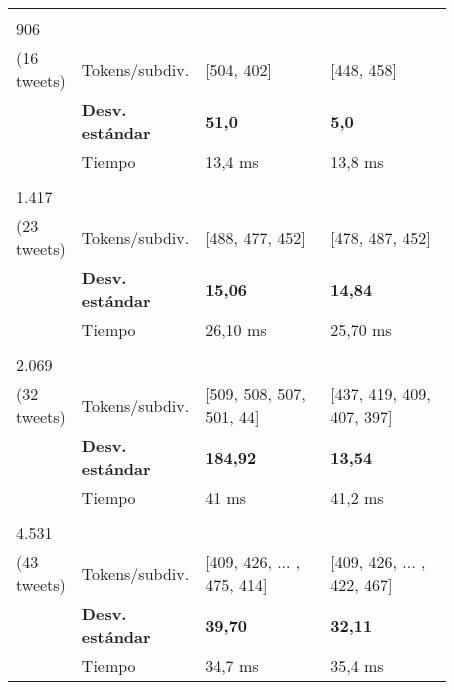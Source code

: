 \begin{table}[H]
\begin{tabular}{>{\centering}b{0.09\linewidth}>{\raggedright}b{0.18\linewidth}>{\raggedright}b{0.3\linewidth}>{\raggedright\arraybackslash}b{0.3\linewidth}}
		\midrule
		
		\multirow{3}{*}{\begin{minipage}{0.5in}\centering 646\\ \scriptsize{906} \\ \tiny{(16 tweets)} \end{minipage}}	& \small{Tokens/subdiv.} & \small{[504, 402]} & \small{[448, 458]} \\
		& \small{\textbf{Desv. estándar}} & \small{\textbf{51,0}} & \small{\textbf{5,0}} \\
		& \small{Tiempo} & \small{13,4 ms} & \small{13,8 ms} \\
		
		\midrule
		
		\multirow{3}{*}{\begin{minipage}{0.5in}\centering 1.089 \\ \scriptsize{1.417} \\ \tiny{(23 tweets)} \end{minipage}}	& \small{Tokens/subdiv.} & \small{[488, 477, 452]} & \small{[478, 487, 452]} \\
		& \small{\textbf{Desv. estándar}} & \small{\textbf{15,06}} & \small{\textbf{14,84}} \\
		& \small{Tiempo} & \small{26,10 ms} & \small{25,70 ms} \\
		
		\midrule
		
		\multirow{3}{*}{\begin{minipage}{0.5in}\centering 1.536\\ \scriptsize{2.069} \\ \tiny{(32 tweets)} \end{minipage}}	& \small{Tokens/subdiv.} & \small{[509, 508, 507, 501, 44]} & \small{[437, 419, 409, 407, 397]} \\
		& \small{\textbf{Desv. estándar}} & \small{\textbf{184,92}} & \small{\textbf{13,54}} \\
		& \small{Tiempo} & \small{41 ms} & \small{41,2 ms} \\
		
		\midrule
		
		\multirow{3}{*}{\begin{minipage}{0.5in}\centering 1.871\\ \scriptsize{4.531} \\ \tiny{(43 tweets)} \end{minipage}}	& \small{Tokens/subdiv.} & \small{[409, 426, ... , 475, 414]} & \small{[409, 426, ... , 422, 467]} \\
		& \small{\textbf{Desv. estándar}} & \small{\textbf{39,70}} & \small{\textbf{32,11}} \\
		& \small{Tiempo} & \small{34,7 ms} & \small{35,4 ms} \\
		

\end{tabular}
\end{table}
